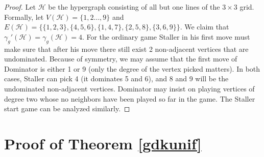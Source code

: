 \documentclass[12pt]{article}
\newcommand\cH{{\mathcal H}}
\begin{document}
\begin{proof}


Let $\cH$ be the hypergraph consisting of all but one lines of the $3\times 3$ grid. Formally, let $V(\cH)=\{1,2\dots,9\}$ and $E(\cH)=\{\{1,2,3\},\{4,5,6\},\{1,4,7\},\{2,5,8\}, \{3,6,9\}\}$. We claim that $\gamma_g'(\cH)=\gamma_g(\cH)=4$. For the ordinary game Staller in his first move must make sure that after his move there still exist 2 non-adjacent vertices that are undominated. Because of symmetry, we may assume that the first move of Dominator is either 1 or 9 (only the degree of the vertex picked matters). In both cases, Staller can pick 4 (it dominates 5 and 6), and 8 and 9 will be the undominated non-adjacent vertices. Dominator may insist on playing vertices of degree two whose no neighbors have been played so far in the game. The Staller start game can be analyzed similarly.
\end{proof}



\section{Proof of Theorem \ref{gdkunif}}
\label{s:pfkunif}
\end{document}
